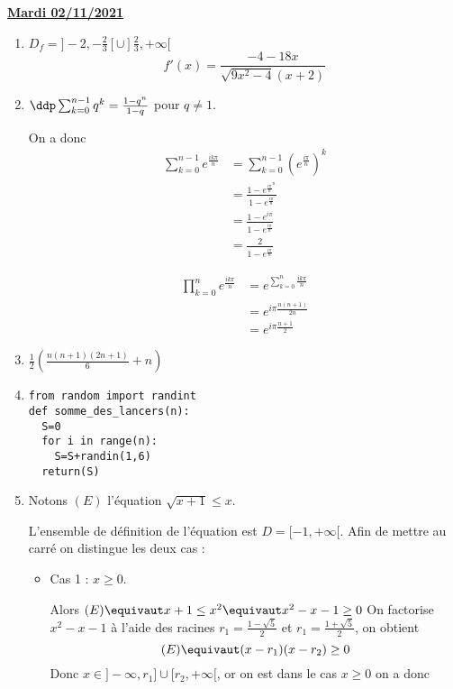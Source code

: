 \documentclass[a4paper, 11pt,reqno]{article}
\newcommand{\jour}[1]{
\begin{center}
\underline{\textbf{#1}}
\end{center}

 }
\begin{document}
\jour{Mardi 02/11/2021}
\begin{correction}
\begin{enumerate}
\item $D_f =]-2,-\frac{2}{3}[ \cup ]\frac{2}{3},+\infty[$
$$f'(x) =\frac{-4-18x}{\sqrt{9x^2-4} (x+2)}$$
\item 
$\ddp \sum_{k=0}^{n-1} q^k = \frac{1-q^n}{1-q}$ pour $q\neq 1$. 

On a donc 
\begin{align*}
\sum_{k=0}^{n-1} e^{\frac{ik\pi}{n}}&=\sum_{k=0}^{n-1} \left(e^{\frac{i \pi}{n}} \right)^k\\
														&=  \frac{1-e^{\frac{i \pi}{n}^n}}{1-e^{\frac{i \pi}{n}}}\\
														&=\frac{1-e^{i \pi}}{1-e^{\frac{i \pi}{n}}}\\
														&=\frac{2}{1-e^{\frac{i \pi}{n}}}
\end{align*}


\begin{align*}
\prod_{k=0}^n e^{\frac{ik\pi}{n}} &=e^{\sum_{k=0}^n \frac{ik\pi}{n}}\\
													&= e^{i\pi\frac{n(n+1)}{2n}}\\
													&= e^{i\pi\frac{n+1}{2}}
\end{align*} 

\item $\frac{1}{2}\left( \frac{n(n+1)(2n+1)}{6} +n\right)$
\item \begin{lstlisting}
from random import randint
def somme_des_lancers(n):
  S=0
  for i in range(n):
    S=S+randin(1,6)
  return(S)
\end{lstlisting}
\item Notons $(E)$ l'équation $\sqrt{x+1} \leq x$.


L'ensemble de définition de l'équation est $D=[-1,+\infty[$.
Afin de mettre au carré on distingue les deux cas : 
\begin{itemize}
\item Cas 1 : $x\geq 0$.

Alors $(E) \equivaut x+1 \leq x^2 \equivaut x^2-x-1\geq 0$
On factorise $x^2-x-1$ à l'aide des racines $r_1=\frac{1-\sqrt{5}}{2}$ et $r_1=\frac{1+\sqrt{5}}{2}$, on obtient 
$$(E) \equivaut (x-r_1)(x-r_2)\geq 0$$
Donc $x\in ]-\infty ,r_1]\cup[r_2,+\infty[ $, or on est dans le cas $x\geq 0$ on  a donc 
\begin{center}
\fbox{cas 1 $x\in [\frac{1+\sqrt{5}}{2},+\infty[$}


\end{center}
\end{itemize}
\end{enumerate}
\end{correction}
\end{document}
